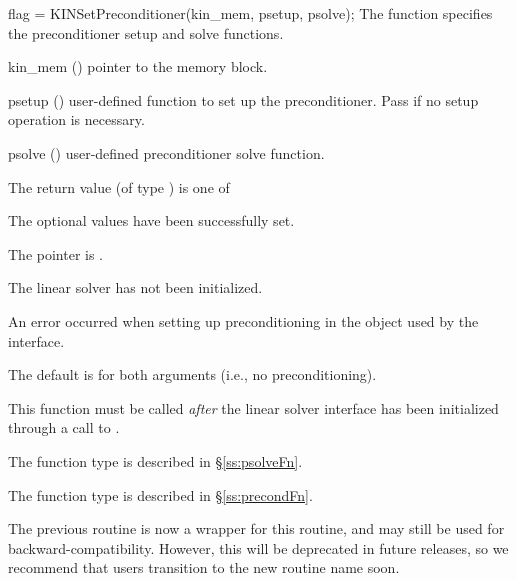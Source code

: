 {
  flag = KINSetPreconditioner(kin\_mem, psetup, psolve);
}
{
  The function  specifies the preconditioner
  setup and solve functions.
}
{
  \begin{args}
  \item[kin\_mem] ()
    pointer to the {\kinsol} memory block.
  \item[psetup] ()
    user-defined function to set up the preconditioner.  Pass  if no setup
    operation is necessary.
  \item[psolve] ()
    user-defined preconditioner solve function.
  \end{args}
}
{
  The return value  (of type ) is one of
  \begin{args}
  \item[\Id{KINLS\_SUCCESS}]
    The optional values have been successfully set.
  \item[\Id{KINLS\_MEM\_NULL}]
    The  pointer is .
  \item[\Id{KINLS\_LMEM\_NULL}]
    The {\kinls} linear solver has not been initialized.
  \item[\Id{KINLS\_SUNLS\_FAIL}]
    An error occurred when setting up preconditioning in the
    {\sunlinsol} object used by the {\kinls} interface.
  \end{args}
}
{
  The default is  for both arguments (i.e., no
  preconditioning).

  This function must be called \emph{after} the {\kinls} linear solver
  interface has been initialized through a call to
  .

  The function type  is described in \S\ref{ss:psolveFn}.

  The function type  is described in \S\ref{ss:precondFn}.

  The previous routine  is now a wrapper
  for this routine, and may still be used for backward-compatibility.
  However, this will be deprecated in future releases, so we recommend
  that users transition to the new routine name soon.
}

